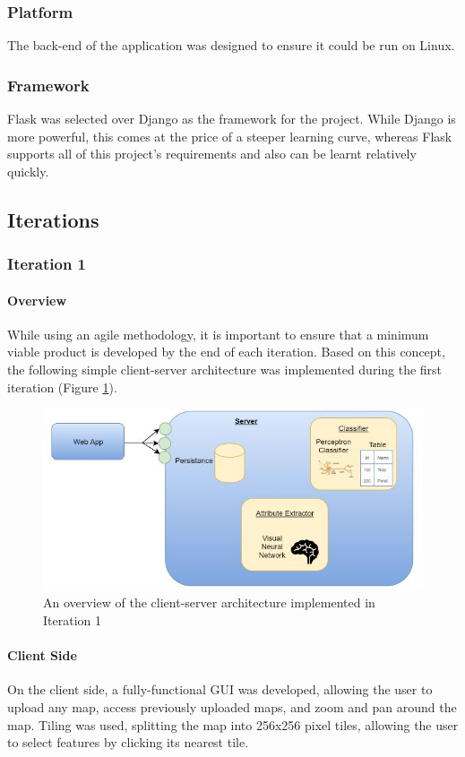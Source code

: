 \subsubsection{Platform}
The back-end of the application was designed to ensure it could be run on Linux. 
\subsubsection{Framework}
Flask was selected over Django as the framework for the project. While Django is more powerful, this comes at the price of a steeper learning curve, whereas Flask supports all of this project’s requirements and also can be learnt relatively quickly.
\subsection{Iterations}
\subsubsection{Iteration 1}
\paragraph{Overview\\}
While using an agile methodology, it is important to ensure that a minimum viable product is developed by the end of each iteration. Based on this concept, the following simple client-server architecture was implemented during the first iteration (Figure \ref{fig:iteration1_overview}). 
\begin{figure}[H]
    \centering
    \includegraphics[width=\textwidth]{figs/4/iteration1_overview}
    \caption{An overview of the client-server architecture implemented in Iteration 1}
    \label{fig:iteration1_overview}
\end{figure}
\paragraph{Client Side\\}
On the client side, a fully-functional GUI was developed, allowing the user to upload any map, access previously uploaded maps, and zoom and pan around the map. Tiling was used, splitting the map into 256x256 pixel tiles, allowing the user to select features by clicking its nearest tile.
